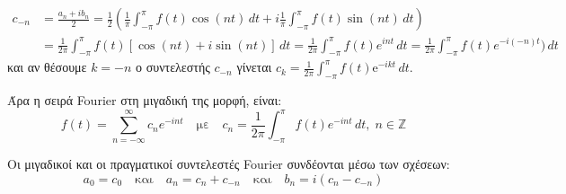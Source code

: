 \begin{align*}
  c_{-n} &= \frac{a_{n}+ib_{n}}{2} = \frac{1}{2} 
  \left(\frac{1}{\pi} \int _{- \pi }^{\pi } f(t) \cos{(nt)} \,{dt} + i
  \frac{1}{\pi} \int _{- \pi }^{\pi } f(t) \sin{(nt)} \,{dt}  \right) \\ 
         &= \frac{1}{2 \pi} \int _{- \pi }^{\pi} f(t) [\cos{(nt)} + i \sin{(nt)}] 
         \,{dt} = \frac{1}{2 \pi} \int _{- \pi }^{\pi } f(t) e^{int} \,{dt} = 
         \frac{1}{2 \pi} \int _{- \pi }^{\pi } f(t) e^{-i(-n)t}) \,{dt} 
\end{align*}
και αν θέσουμε $ k=-n $ ο συντελεστής $ c_{-n} $ γίνεται $ c_{k} =
\frac{1}{2 \pi} \int _{- \pi }^{\pi} f(t) \mathrm{e}^{-ikt}\,{dt} $.

Άρα η σειρά Fourier στη μιγαδική της μορφή, είναι:
\[
  \boxed{f(t) = \sum_{n=- \infty}^{\infty} c_{n} e^{-int} \quad \text{με} \quad c_{n} =
  \frac{1}{2 \pi} \int _{- \pi}^{\pi } f(t) e^{-int} \,{dt}, \; n \in \mathbb{Z}}
\]

\begin{rem}
  Οι μιγαδικοί και οι πραγματικοί συντελεστές Fourier συνδέονται μέσω των σχέσεων:
  \begin{equation}\label{eq:complex_coef}
    a_{0}= c_{0} \quad \text{και} \quad a_{n}= c_{n}+c_{-n} \quad \text{και} \quad 
    b_{n} = i(c_{n}-c_{-n})
  \end{equation} 
\end{rem}










